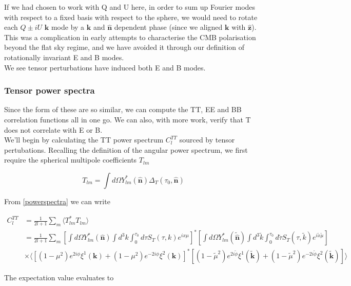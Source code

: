 \documentclass[a4paper,10pt]{article}
\renewcommand{\v}[1]{\mathbf{#1}}
\newcommand{\unit}[1]{\hat{\v{#1}}}
\begin{document}
If we had chosen to work with Q and U here, in order to sum up Fourier modes with respect to a fixed basis with respect to the sphere, we would need to rotate each $Q\pm iU$ $\v{k}$ mode by a $\v{k}$ and $\unit{n}$ dependent phase (since we aligned $\v{k}$ with $\unit{z}$). This was a complication in early attempts to characterise the CMB polarisation beyond the flat sky regime, and we have avoided it through our definition of rotationally invariant E and B modes.\\

We see tensor perturbations have induced both E and B modes.

\subsubsection{Tensor power spectra}

Since the form of these are so similar, we can compute the TT, EE and BB correlation functions all in one go. We can also, with more work, verify that T does not correlate with E or B.\\

We'll begin by calculating the TT power spectrum $C_l^{TT}$ sourced by tensor pertubations. Recalling the definition of the angular power spectrum, we first require the spherical multipole coefficients $T_{lm}$  

\begin{equation}
T_{lm} = \int d\Omega Y_{lm}^*(\unit{n})\Delta_T(\tau_0,\unit{n})
\end{equation}

From \ref{powerspectra} we can write 

\begin{equation}\begin{split}
C_l^{TT} &= \frac{1}{2l+1}\sum_m \langle T_{lm}^*T_{lm} \rangle \\
&= \frac{1}{2l+1} \sum_m [\int d\Omega Y_{lm}^*(\unit{n})\int d^3k\int_0^{\tau_0}d\tau S_T(\tau,k)e^{ix\mu}]^*
[\int d\Omega Y_{lm}^*(\tilde{\unit{n}})\int d^3\tilde{k}\int_0^{\tau_0}d\tilde{\tau}S_T(\tau,\tilde{k})e^{i\tilde{x}\tilde{\mu}}]\\
&\times
\langle [(1-\mu^2) e^{2i\phi} \xi^1(\v{k})+(1-\mu^2) e^{-2i\phi} \xi^2(\v{k})]^*[(1-\tilde{\mu}^2) e^{2i\tilde{\phi}} \xi^1(\v{\tilde{k}})+(1-\tilde{\mu}^2) e^{-2i\tilde{\phi}} \xi^2(\v{\tilde{k}})] \rangle
\end{split}\end{equation}

The expectation value evaluates to
\end{document}
